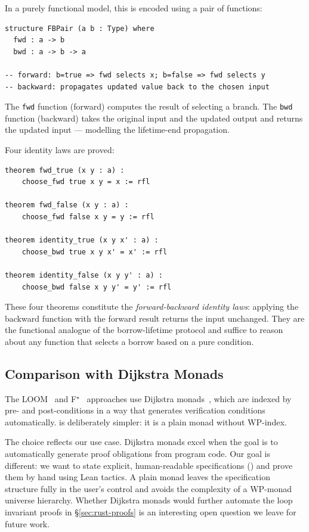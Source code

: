 In a purely functional model, this is encoded using a pair of functions:

\begin{lstlisting}[caption={FBPair: forward-backward representation.},label={lst:fbpair}]
structure FBPair (a b : Type) where
  fwd : a -> b
  bwd : a -> b -> a

-- forward: b=true => fwd selects x; b=false => fwd selects y
-- backward: propagates updated value back to the chosen input
\end{lstlisting}

The \texttt{fwd} function (forward) computes the result of selecting a branch.
The \texttt{bwd} function (backward) takes the original input and the updated
output and returns the updated input — modelling the lifetime-end propagation.

Four identity laws are proved:

\begin{lstlisting}[caption={FBPair identity laws.},label={lst:fblaws}]
theorem fwd_true (x y : a) :
    choose_fwd true x y = x := rfl

theorem fwd_false (x y : a) :
    choose_fwd false x y = y := rfl

theorem identity_true (x y x' : a) :
    choose_bwd true x y x' = x' := rfl

theorem identity_false (x y y' : a) :
    choose_bwd false x y y' = y' := rfl
\end{lstlisting}

These four theorems constitute the \emph{forward-backward identity laws}:
applying the backward function with the forward result returns the input
unchanged. They are the functional analogue of the borrow-lifetime protocol
and suffice to reason about any function that selects a borrow based on
a pure condition.

\subsection{Comparison with Dijkstra Monads}

The LOOM~\cite{loom2026} and F$^\star$~\cite{fstar2016} approaches use Dijkstra
monads~\cite{dijkstraMonads2019}, which are indexed by pre- and post-conditions
in a way that generates verification conditions automatically. \RustM is
deliberately simpler: it is a plain monad without WP-index.

The choice reflects our use case. Dijkstra monads excel when the goal is to
automatically generate proof obligations from program code. Our goal is
different: we want to state explicit, human-readable specifications
(\ProgramSpec) and prove them by hand using Lean tactics. A plain monad
leaves the specification structure fully in the user's control and avoids
the complexity of a WP-monad universe hierarchy. Whether Dijkstra monads
would further automate the loop invariant proofs in \S\ref{sec:rust-proofs}
is an interesting open question we leave for future work.
